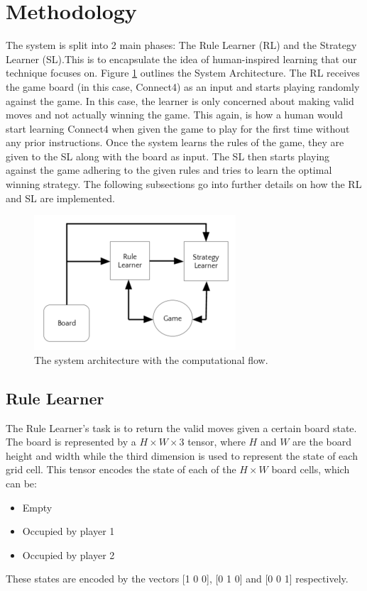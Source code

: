 \section{Methodology}
The system is split into 2 main phases: The Rule Learner (RL) and the Strategy Learner (SL).This is to encapsulate the idea of human-inspired learning that our technique focuses on. Figure \ref{fig:sys_arch} outlines the System Architecture. The RL receives the game board (in this case, Connect4) as an input and starts playing randomly against the game. In this case, the learner is only concerned about making valid moves and not actually winning the game. This again, is how a human would start learning Connect4 when given the game to play for the first time without any prior instructions. Once the system learns the rules of the game, they are given to the SL along with the board as input. The SL then starts playing against the game adhering to the given rules and tries to learn the optimal winning strategy. The following subsections go into further details on how the RL and SL are implemented.

\begin{figure}
  \includegraphics[width=\linewidth]{sys_arch.png}
  \caption{The system architecture with the computational flow.}
  \label{fig:sys_arch}
\end{figure}

\subsection{Rule Learner}
The Rule Learner’s task is to return the valid moves given a certain board state. The board is represented by a $H\times W\times 3$ tensor, where $H$ and $W$ are the board height and width while the third dimension is used to represent the state of each grid cell. This tensor encodes the state of each of the $H \times W$ board cells, which can be:
\begin{itemize}
 \item Empty
 \item Occupied by player 1
 \item Occupied by player 2
\end{itemize}
These states are encoded by the vectors [1 0 0], [0 1 0] and [0 0 1] respectively.

